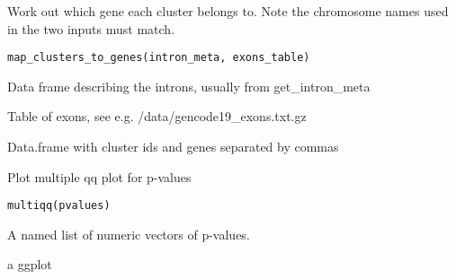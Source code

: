 \documentclass[a4paper]{book}
\begin{document}
%
\begin{Description}\relax
Work out which gene each cluster belongs to. Note the chromosome names used in the two inputs must match.
\end{Description}
%
\begin{Usage}
\begin{verbatim}
map_clusters_to_genes(intron_meta, exons_table)
\end{verbatim}
\end{Usage}
%
\begin{Arguments}
\begin{ldescription}
\item[\code{intron\_meta}] Data frame describing the introns, usually from get\_intron\_meta

\item[\code{exons\_table}] Table of exons, see e.g. /data/gencode19\_exons.txt.gz
\end{ldescription}
\end{Arguments}
%
\begin{Value}
Data.frame with cluster ids and genes separated by commas
\end{Value}
%
\begin{Description}\relax
Plot multiple qq plot for p-values
\end{Description}
%
\begin{Usage}
\begin{verbatim}
multiqq(pvalues)
\end{verbatim}
\end{Usage}
%
\begin{Arguments}
\begin{ldescription}
\item[\code{pvalues}] A named list of numeric vectors of p-values.
\end{ldescription}
\end{Arguments}
%
\begin{Value}
a ggplot
\end{Value}
\printindex{}
\end{document}

